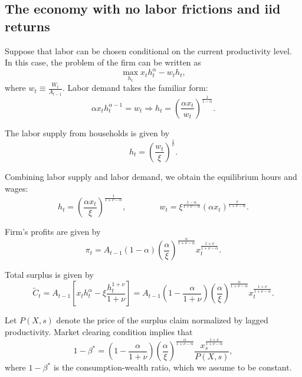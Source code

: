 \subsection{The economy with no labor frictions and iid returns}

Suppose that labor can be chosen conditional on the current productivity level. In this case, the problem of the firm can be written as
\begin{equation}
    \max_{h_{t}} x_t h_t^\alpha - w_t h_t,
\end{equation}
where $w_t \equiv \frac{W_t}{A_{t-1}}$. Labor demand takes the familiar form:
\begin{equation}
    \alpha x_t h_t^{\alpha-1} = w_t \Rightarrow h_t = \left( \frac{\alpha x_t}{w_t}\right)^{\frac{1}{1-\alpha}}.
\end{equation}

The labor supply from households is given by
\begin{equation}
    h_t = \left( \frac{w_t}{\xi} \right)^{\frac{1}{\nu}}.
\end{equation}

Combining labor supply and labor demand, we obtain the equilibrium hours and wages:
\begin{equation}
    h_t = \left( \frac{\alpha x_t}{\xi}\right)^{\frac{1}{1+\nu-\alpha}}, \qquad \qquad w_t = \xi^{\frac{1-\alpha}{1+\nu-\alpha}} (\alpha x_t)^{\frac{\nu}{1+ \nu-\alpha}}.
\end{equation}

Firm's profits are given by 
\begin{equation}
    \pi_t = A_{t-1} (1-\alpha) \left( \frac{\alpha}{\xi} \right)^{\frac{\alpha}{1+\nu-\alpha}} x_t^{\frac{1+\nu}{1+\nu-\alpha}}.
\end{equation}

Total surplus is given by
\begin{equation}
    \tilde{C}_t = A_{t-1} \left[ x_t h_t^\alpha - \xi \frac{h_{t}^{1+\nu}}{1+\nu} \right] = A_{t-1} \left(1 - \frac{\alpha}{1+\nu} \right) \left( \frac{\alpha}{\xi} \right)^{\frac{\alpha}{1+\nu-\alpha}} x_t^{\frac{1+\nu}{1+\nu-\alpha}}.
\end{equation}

Let $P(X,s)$ denote the price of the surplus claim normalized by lagged productivity. Market clearing condition implies that
\begin{equation}
    1-\beta^* = \left(1 - \frac{\alpha}{1+\nu} \right) \left( \frac{\alpha}{\xi} \right)^{\frac{\alpha}{1+\nu-\alpha}} \frac{x_s^{\frac{1+\nu}{1+\nu-\alpha}}}{P(X,s)},
\end{equation}
where $1-\beta^*$ is the consumption-wealth ratio, which we assume to be constant.

